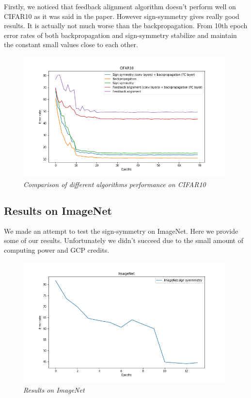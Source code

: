 \documentclass{article} %
\begin{document}
Firstly, we noticed that feedback alignment algorithm doesn't perform well on CIFAR10 as it was said in the paper. However sign-symmetry gives really good results. It is actually not much worse than the backpropagation. From 10th epoch error rates of both backpropagation and sign-symmetry stabilize and maintain the constant small values close to each other.
\newpage
\begin{figure}[h]
	\centering
	\includegraphics[width=11cm]{../results_processing/CIFAR10_results.png}
	\caption{\textit{Comparison of different algorithms performance on CIFAR10}}
\end{figure}

\subsection{Results on ImageNet}
We made an attempt to test the sign-symmetry on ImageNet. Here we provide some of our results. Unfortunately we didn't succeed due to the small amount of computing power and GCP credits. 
\begin{figure}[h]
	\centering
	\includegraphics[width=11cm]{../results_processing/ImageNet_results.png}
	\caption{\textit{Results on ImageNet}}
\end{figure}
\end{document}
